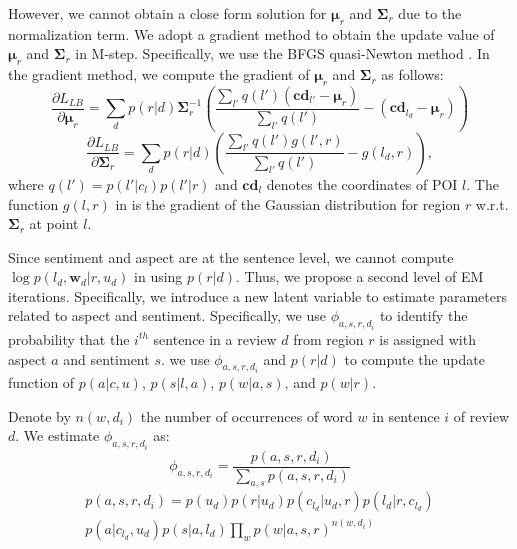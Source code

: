 However, we cannot obtain a close form solution for $\boldsymbol{\mu}_r$ and
$\boldsymbol{\Sigma}_r$ due to the normalization term. We adopt a gradient method
to obtain the update value of $\boldsymbol{\mu}_r$ and $\boldsymbol{\Sigma}_r$ in M-step.
Specifically, we use the BFGS quasi-Newton method \cite{Kurashima:2013,Liu:1989}.
In the gradient method, we compute the gradient of $\boldsymbol{\mu}_r$ and
$\boldsymbol{\Sigma}_r$ as follows:
\begin{equation}
\frac{\partial L_{LB}}{\partial \boldsymbol{\mu}_r}=
\sum_d{p(r|d)\boldsymbol{\Sigma}_r^{-1}\left(\frac{\sum_{l'}{q(l')(\boldsymbol{cd}_{l'}-\boldsymbol{\mu}_r)}}{\sum_{l'}{q(l')}}-
(\boldsymbol{cd}_{l_d}-\boldsymbol{\mu}_r)\right)}
\label{eq:gmu}
\end{equation}
\begin{equation}
\frac{\partial L_{LB}}{\partial \boldsymbol{\Sigma}_r}=\sum_d{p(r|d)(\frac{\sum_{l'}{q(l')g(l', r)}}{\sum_{l'}{q(l')}}-g(l_d, r))}
\label{eq:gsigma},
\end{equation}
where $q(l')=p(l'|c_l)p(l'|r)$ and $\boldsymbol{cd}_{l}$ denotes the coordinates of POI $l$.
The function $g(l, r)$ in  is the gradient of the Gaussian distribution for region $r$
w.r.t. $\boldsymbol{\Sigma}_r$ at point $l$.

Since sentiment and aspect are at the sentence level, we
cannot compute $\log p(l_d,\mathbf{w}_d|r,u_d)$
in  using $p(r|d)$. 
Thus, we propose a second level of EM iterations.
Specifically, we introduce a new latent variable to estimate parameters related to
aspect and sentiment. Specifically, we use $\phi_{a,s,r,d_i}$ to identify
the probability that the $i^{th}$ sentence in a review $d$ from
region $r$ is assigned with aspect $a$ and sentiment $s$.
we use $\phi_{a,s,r,d_i}$ and $p(r|d)$ to compute the update
function of $p(a|c,u)$, $p(s|l,a)$,
$p(w|a,s)$, and $p(w|r)$.

Denote by $n(w,d_i)$ the number of occurrences of word $w$ in sentence $i$
of review $d$. We estimate $\phi_{a,s,r,d_i}$ as:
\begin{equation}
\phi_{a,s,r,d_i}=\frac{p(a,s,r,d_i)}{\sum_{a,s}{p(a,s,r,d_i)}}
\label{eq:pasrdi}
\end{equation}
\begin{equation}
\begin{split}
p(a,s,r,d_i)=p(u_d)p(r|u_d)p(c_{l_d}|u_d,r)p(l_d|r,c_{l_d})\\
p(a|c_{l_d},u_d)p(s|a,l_d)\prod_{w}{p(w|a,s,r)^{n(w,d_i)}}
\end{split}
\end{equation}

